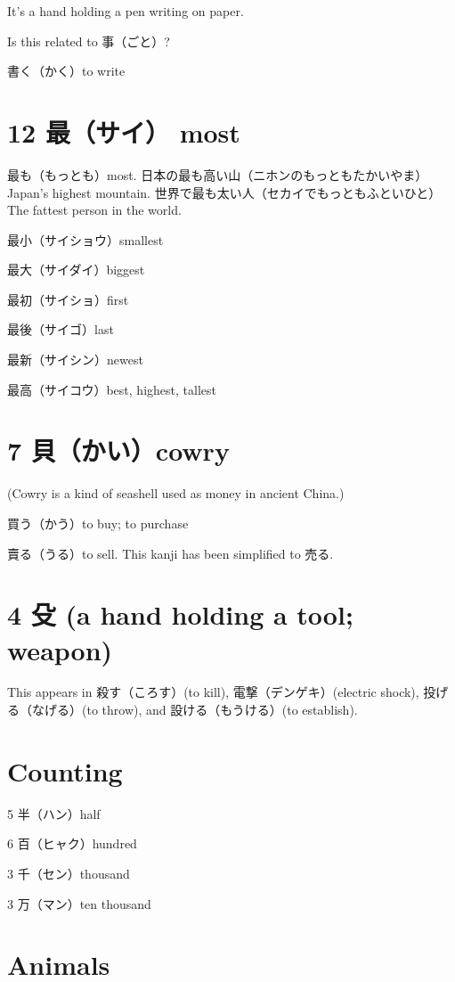 It's a hand holding a pen writing on paper.

Is this related to 事（ごと）?

書く（かく）to write

\section{12 最（サイ） most}

最も（もっとも）most.
日本の最も高い山（ニホンのもっともたかいやま）Japan's highest mountain.
世界で最も太い人（セカイでもっともふといひと）The fattest person in the world.

最小（サイショウ）smallest

最大（サイダイ）biggest

最初（サイショ）first

最後（サイゴ）last

最新（サイシン）newest

最高（サイコウ）best, highest, tallest

\section{7 貝（かい）cowry}

(Cowry is a kind of seashell used as money in ancient China.)

買う（かう）to buy; to purchase

賣る（うる）to sell.
This kanji has been simplified to 売る.

\section{4 殳 (a hand holding a tool; weapon)}

This appears in
殺す（ころす）(to kill),
電撃（デンゲキ）(electric shock),
投げる（なげる）(to throw),
and 設ける（もうける）(to establish).

\section{Counting}

5 半（ハン）half

6 百（ヒャク）hundred

3 千（セン）thousand

3 万（マン）ten thousand

\section{Animals}

